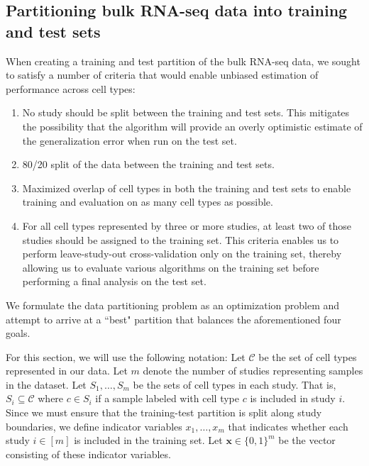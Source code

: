 \subsection*{Partitioning bulk RNA-seq data into training and test sets}

When creating a training and test partition of the bulk RNA-seq data, we sought to satisfy a number of criteria that would enable unbiased estimation of performance across cell types:

\begin{enumerate}
    \item No study should be split between the training and test sets. This mitigates the possibility that the algorithm will provide an overly optimistic estimate of the generalization error when run on the test set. 
    \item 80/20 split of the data between the training and test sets.
    \item Maximized overlap of cell types in both the training and test sets to enable training and evaluation on as many cell types as possible.
    \item  For all cell types represented by three or more studies, at least two of those studies should be assigned to the training set. This criteria enables us to perform leave-study-out cross-validation only on the training set, thereby allowing us to evaluate various algorithms on the training set before performing a final analysis on the test set.  
\end{enumerate}
We formulate the data partitioning problem as an optimization problem and attempt to arrive at a ``best" partition that balances the aforementioned four goals.

For this section, we will use the following notation: Let $\mathcal{C}$ be the set of cell types represented in our data. Let $m$ denote the number of studies representing samples in the dataset. Let $S_1, \dots, S_m$ be the sets of cell types in each study.   That is, $S_i \subseteq \mathcal{C}$ where $c \in S_i$ if a sample labeled with cell type $c$ is included in study $i$.  Since we must ensure that the training-test partition is split along study boundaries, we define indicator variables $x_1, \dots, x_m$ that indicates whether each study $i \in [m]$ is included in the training set. Let $\boldsymbol{x} \in \{0, 1\}^m$ be the vector consisting of these indicator variables. 

